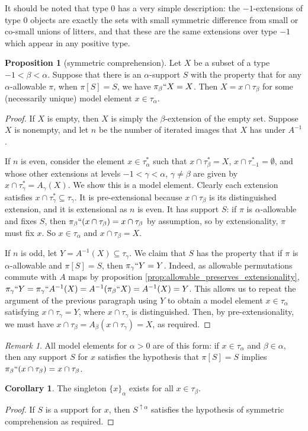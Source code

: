 \documentclass{article}
\theoremstyle{definition}
\newtheorem{proposition}[theorem]{Proposition}
\newtheorem{corollary}[theorem]{Corollary}
\theoremstyle{remark}
\newtheorem{remark}[theorem]{Remark}
\begin{document}
{
It should be noted that type 0 has a very simple description:  the $-1$-extensions of type 0 objects are exactly the sets with small symmetric difference from small or co-small unions of litters, and that these are the same extensions over type $-1$ which appear in any positive type.

\begin{proposition}[symmetric comprehension]\label{prop:symmetric_comprehension}
Let $X$ be a subset of a type $-1 < \beta < \alpha$.
Suppose that there is an $\alpha$-support $S$ with the property that for any $\alpha$-allowable $\pi$, when $\pi[S] = S$, we have $\pi_\beta``X = X$.
Then $X = x \cap \tau_\beta$ for some (necessarily unique) model element $x \in \tau_\alpha$.
\end{proposition}
\begin{proof}
If $X$ is empty, then $X$ is simply the $\beta$-extension of the empty set.
Suppose $X$ is nonempty, and let $n$ be the number of iterated images that $X$ has under $A^{-1}$.

If $n$ is even, consider the element $x \in \tau^*_\alpha$ such that $x \cap \tau^*_\beta = X$, $x \cap \tau^*_{-1} = \emptyset$, and whose other extensions at levels $-1 < \gamma < \alpha$, $\gamma \neq \beta$ are given by $x \cap \tau^*_\gamma = A_\gamma(X)$.
We show this is a model element.
Clearly each extension satisfies $x \cap \tau^*_\gamma \subseteq \tau_\gamma$.
It is pre-extensional because $x \cap \tau_\beta$ is its distinguished extension, and it is extensional as $n$ is even.
It has support $S$: if $\pi$ is $\alpha$-allowable and fixes $S$, then $\pi_\beta `` (x \cap \tau_\beta) = x \cap \tau_\beta$ by assumption, so by extensionality, $\pi$ must fix $x$.
So $x \in \tau_\alpha$ and $x \cap \tau_\beta = X$.

If $n$ is odd, let $Y = A^{-1}(X) \subseteq \tau_\gamma$.
We claim that $S$ has the property that if $\pi$ is $\alpha$-allowable and $\pi[S] = S$, then $\pi_\gamma``Y = Y$.
Indeed, as allowable permutations commute with $A$ maps by proposition \ref{prop:allowable_preserves_extensionality}, $\pi_\gamma``Y = \pi_\gamma``A^{-1}(X) = A^{-1}(\pi_\beta``X) = A^{-1}(X) = Y$.
This allows us to repeat the argument of the previous paragraph using $Y$ to obtain a model element $x \in \tau_\alpha$ satisfying $x \cap \tau_\gamma = Y$, where $x \cap \tau_\gamma$ is distinguished.
Then, by pre-extensionality, we must have $x \cap \tau_\beta = A_\beta(x \cap \tau_\gamma) = X$, as required.
\end{proof}
\begin{remark}
  All model elements for $\alpha > 0$ are of this form: if $x \in \tau_\alpha$ and $\beta \in \alpha$, then any support $S$ for $x$ satisfies the hypothesis that $\pi[S] = S$ implies $\pi_\beta``(x \cap \tau_\beta) = x \cap \tau_\beta$.
\end{remark}
\begin{corollary}
The singleton $\{x\}_\alpha$ exists for all $x \in \tau_\beta$.
\end{corollary}
\begin{proof}
If $S$ is a support for $x$, then $S^{\uparrow \alpha}$ satisfies the hypothesis of symmetric comprehension as required.
\end{proof}

}
\end{document}
